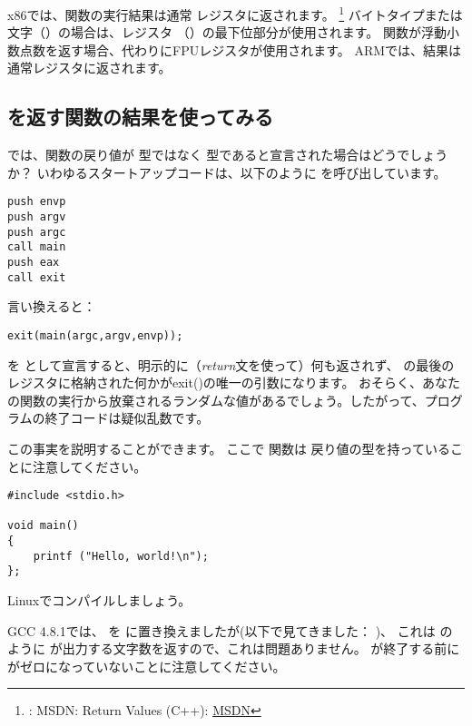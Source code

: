 

x86では、関数の実行結果は通常 \EAX レジスタに返されます。
\footnote{\Seealso: MSDN: Return Values (C++): \href{http://msdn.microsoft.com/en-us/library/7572ztz4.aspx}{MSDN}}
バイトタイプまたは文字（\Tchar）の場合は、レジスタ \EAX （\AL）の最下位部分が使用されます。
関数が浮動小数点数を返す場合、代わりにFPUレジスタが使用されます。 
ARMでは、結果は通常レジスタに返されます。

\subsection{\Tvoid を返す関数の結果を使ってみる}
\label{UseResultOfVoidFunc}

では、\main 関数の戻り値が \Tint 型ではなく \Tvoid 型であると宣言された場合はどうでしょうか？
いわゆるスタートアップコードは、以下のように \main を呼び出しています。

\begin{lstlisting}[style=customasmx86]
push envp
push argv
push argc
call main
push eax
call exit
\end{lstlisting}

言い換えると：

\begin{lstlisting}[style=customc]
exit(main(argc,argv,envp));
\end{lstlisting}

\main を \Tvoid として宣言すると、明示的に（\emph{return}文を使って）何も返されず、
\main の最後の \EAX レジスタに格納された何かがexit()の唯一の引数になります。
おそらく、あなたの関数の実行から放棄されるランダムな値があるでしょう。したがって、プログラムの終了コードは疑似乱数です。
\par
この事実を説明することができます。
ここで \main 関数は \Tvoid 戻り値の型を持っていることに注意してください。

\begin{lstlisting}[style=customc]
#include <stdio.h>

void main()
{
	printf ("Hello, world!\n");
};
\end{lstlisting}

Linuxでコンパイルしましょう。

GCC 4.8.1では、 \printf を \puts に置き換えましたが(以下で見てきました： )、
これは \printf のように \puts が出力する文字数を返すので、これは問題ありません。 
\main が終了する前に \EAX がゼロになっていないことに注意してください。

